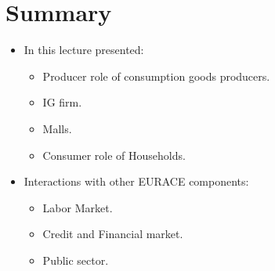 \documentclass{beamer}
\begin{document}
\section{Summary}
\frame
{
\begin{itemize}
	\item In this lecture presented:
	\begin{itemize}
	\item Producer role of consumption goods producers.
	\item IG firm.
	\item Malls.
	\item Consumer role of Households.
\end{itemize}

\item Interactions with other EURACE components:
\begin{itemize}
	\item Labor Market.
	\item Credit and Financial market.
	\item Public sector.
\end{itemize}
\end{itemize}
}

  
\end{document}
